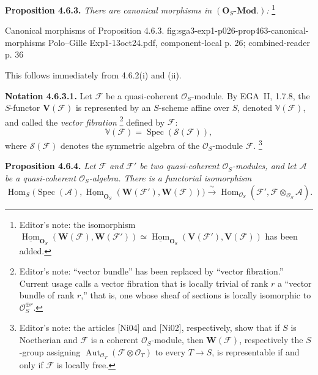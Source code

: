 \medskip
\noindent\textbf{Proposition 4.6.3.}
\textit{There are canonical morphisms in
\((\mathbf O_S\text{-}\mathbf{Mod.})\):}
\footnote{Editor's note: the isomorphism
\(\underline{\operatorname{Hom}}_{\mathbf O_S}
(\mathbf W(\mathscr F),\mathbf W(\mathscr F'))
\simeq
\underline{\operatorname{Hom}}_{\mathbf O_S}
(\mathbf V(\mathscr F'),\mathbf V(\mathscr F))\)
has been added.}

  {Canonical morphisms of Proposition 4.6.3.}
  {fig:sga3-exp1-p026-prop463-canonical-morphisms}
  {Polo--Gille Exp1-13oct24.pdf, component-local p. 26; combined-reader p. 36}

This follows immediately from 4.6.2(i) and (ii).

\medskip
\noindent\textbf{Notation 4.6.3.1.}
Let \(\mathscr F\) be a quasi-coherent \(\mathcal O_S\)-module. By
EGA~II, 1.7.8, the \(S\)-functor \(\mathbf V(\mathscr F)\) is
represented by an \(S\)-scheme affine over \(S\), denoted
\(\mathbb V(\mathscr F)\), and called the \emph{vector fibration}
\footnote{Editor's note: ``vector bundle'' has been replaced by ``vector
fibration.'' Current usage calls a vector fibration that is locally
trivial of rank \(r\) a ``vector bundle of rank \(r\),'' that is, one
whose sheaf of sections is locally isomorphic to
\(\mathcal O_S^{\oplus r}\).}
defined by \(\mathscr F\):
\[
  \mathbb V(\mathscr F)=\operatorname{Spec}(\mathcal S(\mathscr F)),
\]
where \(\mathcal S(\mathscr F)\) denotes the symmetric algebra of the
\(\mathcal O_S\)-module \(\mathscr F\).
\footnote{Editor's note: the articles [Ni04] and [Ni02], respectively,
show that if \(S\) is Noetherian and \(\mathscr F\) is a coherent
\(\mathcal O_S\)-module, then \(\mathbf W(\mathscr F)\), respectively
the \(S\)-group assigning
\(\operatorname{Aut}_{\mathcal O_T}
(\mathscr F\otimes\mathcal O_T)\) to every \(T\to S\), is representable
if and only if \(\mathscr F\) is locally free.}

\medskip
\noindent\textbf{Proposition 4.6.4.}
\textit{Let \(\mathscr F\) and \(\mathscr F'\) be two quasi-coherent
\(\mathcal O_S\)-modules, and let \(\mathscr A\) be a quasi-coherent
\(\mathcal O_S\)-algebra. There is a functorial isomorphism
\[
  \operatorname{Hom}_S
   \bigl(\operatorname{Spec}(\mathscr A),
     \underline{\operatorname{Hom}}_{\mathbf O_S}
       (\mathbf W(\mathscr F'),\mathbf W(\mathscr F))\bigr)
  \xrightarrow{\ \sim\ }
  \operatorname{Hom}_{\mathcal O_S}
    (\mathscr F',\mathscr F\otimes_{\mathcal O_S}\mathscr A).
\]}


